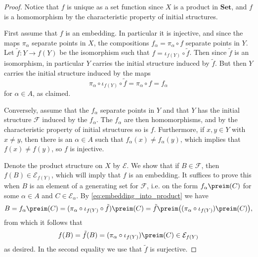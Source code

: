 \documentclass[article, a4paper, 11pt, oneside]{memoir}
\numberwithin{equation}{chapter}
\newcommand{\calE}{\mathcal{E}}
\newcommand{\calF}{\mathcal{F}}
\newcommand{\ncat}[1]{\mathbf{#1}} %
\newcommand{\catSet}{\ncat{Set}} %
\begin{document}
\begin{proof}
    Notice that $f$ is unique as a set function since $X$ is a product in $\catSet$, and $f$ is a homomorphism by the characteristic property of initial structures.

    First assume that $f$ is an embedding. In particular it is injective, and since the maps $\pi_\alpha$ separate points in $X$, the compositions $f_\alpha = \pi_\alpha \circ f$ separate points in $Y$. Let $\tilde f \colon Y \to f(Y)$ be the isomorphism such that $f = \iota_{f(Y)} \circ \tilde f$. Then since $\tilde f$ is an isomorphism, in particular $Y$ carries the initial structure induced by $\tilde f$. But then $Y$ carries the initial structure induced by the maps
    \begin{equation}
        \label{eq:embedding_into_product}
        \pi_\alpha \circ \iota_{f(Y)} \circ \tilde f
            = \pi_\alpha \circ f
            = f_\alpha
    \end{equation}
    for $\alpha \in A$, as claimed.

    Conversely, assume that the $f_\alpha$ separate points in $Y$ and that $Y$ has the initial structure $\calF$ induced by the $f_\alpha$. The $f_\alpha$ are then homomorphisms, and by the characteristic property of initial structures so is $f$. Furthermore, if $x,y \in Y$ with $x \neq y$, then there is an $\alpha \in A$ such that $f_\alpha(x) \neq f_\alpha(y)$, which implies that $f(x) \neq f(y)$, so $f$ is injective.

    Denote the product structure on $X$ by $\calE$. We show that if $B \in \calF$, then $f(B) \in \calE_{f(Y)}$, which will imply that $f$ is an embedding. It suffices to prove this when $B$ is an element of a generating set for $\calF$, i.e. on the form $f_\alpha\preim(C)$ for some $\alpha \in A$ and $C \in \calE_\alpha$. By \eqref{eq:embedding_into_product} we have
    \begin{equation*}
        B
            = f_\alpha\preim(C)
            = (\pi_\alpha \circ \iota_{f(Y)} \circ \tilde f)\preim(C)
            = \tilde f\preim \big( (\pi_\alpha \circ \iota_{f(Y)})\preim(C) \big),
    \end{equation*}
    from which it follows that
    \begin{equation*}
        f(B)
            = \tilde f(B)
            = (\pi_\alpha \circ \iota_{f(Y)})\preim(C)
            \in \calE_{f(Y)}
    \end{equation*}
    as desired. In the second equality we use that $\tilde f$ is surjective.
\end{proof}
\end{document}
